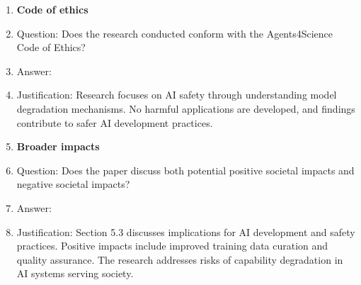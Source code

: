 \documentclass{article}
\begin{document}
\begin{enumerate}
\item {\bf Code of ethics}
    \item[] Question: Does the research conducted conform with the Agents4Science Code of Ethics?
    \item[] Answer: \answerYes{}
    \item[] Justification: Research focuses on AI safety through understanding model degradation mechanisms. No harmful applications are developed, and findings contribute to safer AI development practices.

\item {\bf Broader impacts}
    \item[] Question: Does the paper discuss both potential positive societal impacts and negative societal impacts?
    \item[] Answer: \answerYes{}
    \item[] Justification: Section 5.3 discusses implications for AI development and safety practices. Positive impacts include improved training data curation and quality assurance. The research addresses risks of capability degradation in AI systems serving society.

\end{enumerate}
\end{document}
